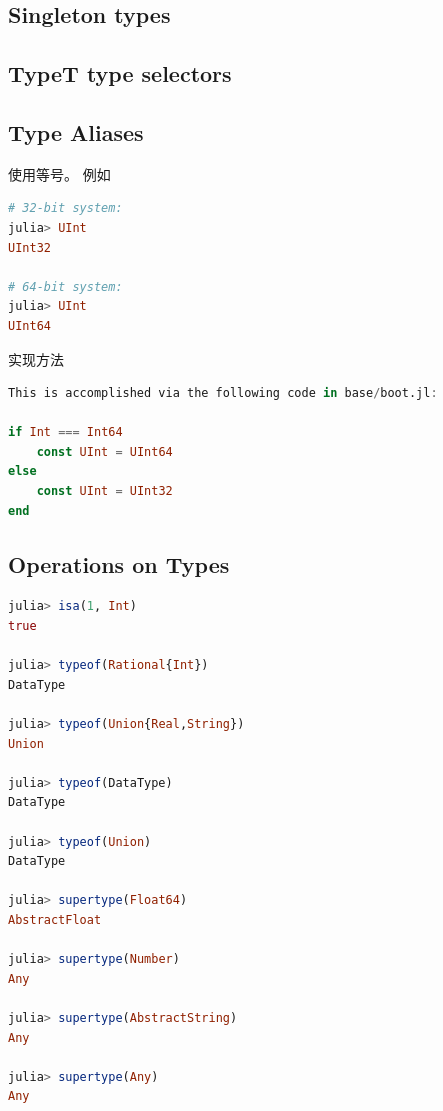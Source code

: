 \subsection{Singleton types}

\subsection{Type{T} type selectors}

\subsection{Type Aliases}
使用等号。 例如
\begin{lstlisting}[language=julia]
# 32-bit system:
julia> UInt
UInt32

# 64-bit system:
julia> UInt
UInt64
\end{lstlisting}
实现方法
\begin{lstlisting}[language=julia]
This is accomplished via the following code in base/boot.jl:

if Int === Int64
    const UInt = UInt64
else
    const UInt = UInt32
end
\end{lstlisting}

\subsection{Operations on Types}
\begin{lstlisting}[language=julia]
julia> isa(1, Int)
true

julia> typeof(Rational{Int})
DataType

julia> typeof(Union{Real,String})
Union

julia> typeof(DataType)
DataType

julia> typeof(Union)
DataType

julia> supertype(Float64)
AbstractFloat

julia> supertype(Number)
Any

julia> supertype(AbstractString)
Any

julia> supertype(Any)
Any
\end{lstlisting}
